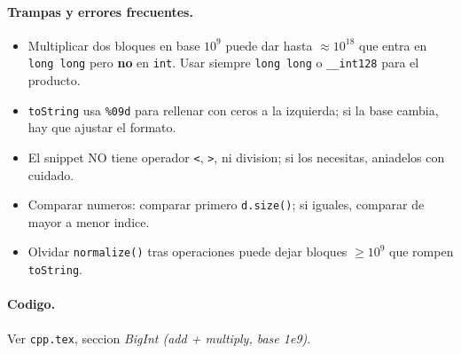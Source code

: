 \paragraph{Trampas y errores frecuentes.}
\begin{itemize}\setlength\itemsep{0pt}
	\item Multiplicar dos bloques en base $10^9$ puede dar hasta $\approx 10^{18}$ que entra en \texttt{long long} pero \textbf{no} en \texttt{int}. Usar siempre \texttt{long long} o \texttt{\_\_int128} para el producto.
	\item \texttt{toString} usa \texttt{\%09d} para rellenar con ceros a la izquierda; si la base cambia, hay que ajustar el formato.
	\item El snippet NO tiene operador \texttt{<}, \texttt{>}, ni division; si los necesitas, aniadelos con cuidado.
	\item Comparar numeros: comparar primero \texttt{d.size()}; si iguales, comparar de mayor a menor indice.
	\item Olvidar \texttt{normalize()} tras operaciones puede dejar bloques $\ge 10^9$ que rompen \texttt{toString}.
\end{itemize}

\paragraph{Codigo.}
Ver \texttt{cpp.tex}, seccion \textit{BigInt (add + multiply, base 1e9)}.

\vspace{0.5em}
